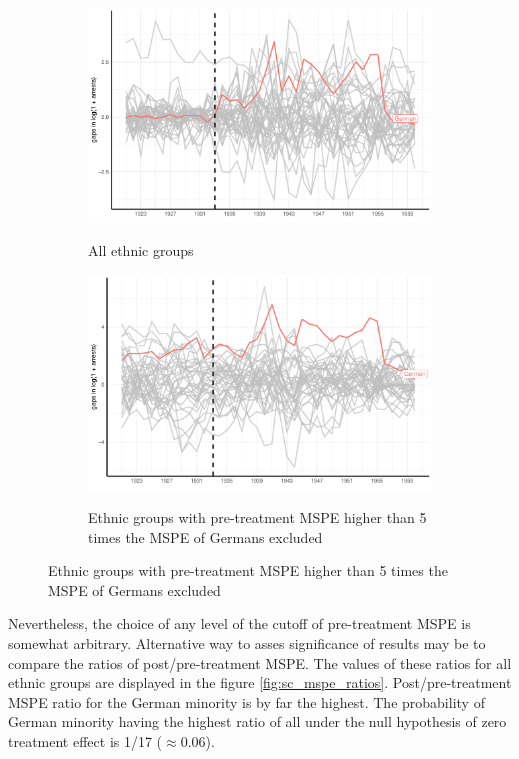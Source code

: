 \begin{figure}[hbtp] 
\caption{Gaps between synthetic control and actual values for placebo tests}
\begin{subfigure}{\textwidth}
\caption{All ethnic groups}
\includegraphics[width=0.9\linewidth]{plots/synthetic_control/ethnicity_imputation/annual/placebo_highlight_all_imp_date.pdf}
\label{fig:sc_placebo_gaps_all}
\end{subfigure}
\begin{subfigure}{\textwidth}
\caption{Ethnic groups with pre-treatment MSPE higher than 5 times the MSPE of Germans excluded}
\includegraphics[width=0.9\linewidth]{plots/synthetic_control/ethnicity_imputation/annual/placebo_highlight_mspe_5_lower_imp_date.pdf}
\label{fig:sc_placebo_gaps_all_5_times}
\end{subfigure}
\label{fig:sc_placebo_gaps}
\end{figure}

Nevertheless, the choice of any level of the cutoff of pre-treatment MSPE %
is somewhat arbitrary. Alternative way to asses significance of results may be to compare the ratios of  post/pre-treatment MSPE.  The values of these ratios for all ethnic groups are displayed in the figure \ref{fig:sc_mspe_ratios}. Post/pre-treatment MSPE ratio for the German minority is by far the highest. The probability of German minority having the highest ratio of all under the null hypothesis of zero treatment effect is 1/17 ($\approx 0.06$). 

